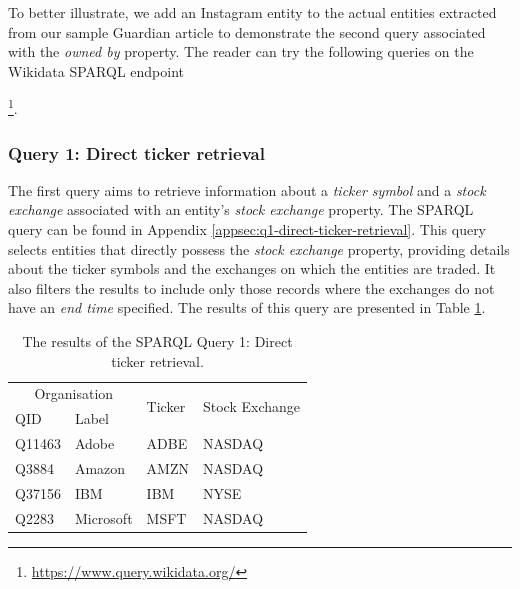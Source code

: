 To better illustrate, we add an Instagram entity to the actual entities extracted from our sample Guardian article to demonstrate the second query associated with the \textit{owned by} property. The reader can try the following queries on the Wikidata SPARQL endpoint{\footnote{\href{https://www.query.wikidata.org/}{https://www.query.wikidata.org/}}.

\subsubsection{Query 1: Direct ticker retrieval}
\label{subsubsec:q1-direct-ticker-retrieval}
The first query aims to retrieve information about a \textit{ticker symbol} and a \textit{stock exchange} associated with an entity's \textit{stock exchange} property. The SPARQL query can be found in Appendix \ref{appsec:q1-direct-ticker-retrieval}. This query selects entities that directly possess the \textit{stock exchange} property, providing details about the ticker symbols and the exchanges on which the entities are traded. It also filters the results to include only those records where the exchanges do not have an \textit{end time} specified. The results of this query are presented in Table \ref{table:sparql_query_1_results}.

\begin{table}[ht]
    \centering
    \caption{The results of the SPARQL Query 1: Direct ticker retrieval.}
    \label{table:sparql_query_1_results}
    \begin{tabular}{l l l l}
    \hline
    \multicolumn{2}{c}{Organisation} & \multirow{2}{*}{Ticker} & \multirow{2}{*}{Stock Exchange}\\
    \cline{1-2}
    QID & Label \\
    \hline
    Q11463 & Adobe & ADBE & NASDAQ \\ 
    Q3884 & Amazon & AMZN & NASDAQ \\ 
    Q37156 & IBM & IBM & NYSE \\ 
    Q2283 & Microsoft & MSFT & NASDAQ \\
    \hline
    \end{tabular}
\end{table}

}
